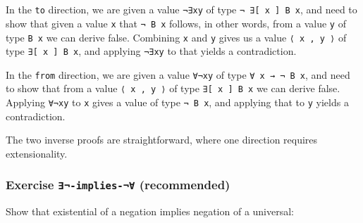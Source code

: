 \begin{fence}
\begin{code}
\AgdaSpace{}%
\AgdaSpace{}%
\AgdaSpace{}%
\AgdaOperator{\AgdaInductiveConstructor{,}}\AgdaSpace{}%
\AgdaSpace{}%
\AgdaSpace{}%
\AgdaSpace{}%
\AgdaSpace{}%
\AgdaSymbol{\}}\AgdaSpace{}%
\AgdaSymbol{\}}\<%
\\
%
\>[4]\AgdaSymbol{;}\AgdaSpace{}%
\AgdaSpace{}%
\AgdaSymbol{=}%
\>[17]\AgdaSpace{}%
\AgdaSpace{}%
\AgdaSpace{}%
\AgdaSpace{}%
\AgdaSymbol{\}}\<%
\\
%
\>[4]\AgdaSymbol{\}}\<%
\end{code}
\end{fence}

In the \texttt{to} direction, we are given a value \texttt{¬∃xy} of type
\texttt{¬\ ∃{[}\ x\ {]}\ B\ x}, and need to show that given a value
\texttt{x} that \texttt{¬\ B\ x} follows, in other words, from a value
\texttt{y} of type \texttt{B\ x} we can derive false. Combining
\texttt{x} and \texttt{y} gives us a value \texttt{⟨\ x\ ,\ y\ ⟩} of
type \texttt{∃{[}\ x\ {]}\ B\ x}, and applying \texttt{¬∃xy} to that
yields a contradiction.

In the \texttt{from} direction, we are given a value \texttt{∀¬xy} of
type \texttt{∀\ x\ →\ ¬\ B\ x}, and need to show that from a value
\texttt{⟨\ x\ ,\ y\ ⟩} of type \texttt{∃{[}\ x\ {]}\ B\ x} we can derive
false. Applying \texttt{∀¬xy} to \texttt{x} gives a value of type
\texttt{¬\ B\ x}, and applying that to \texttt{y} yields a
contradiction.

The two inverse proofs are straightforward, where one direction requires
extensionality.

\hypertarget{exercise--implies--recommended}{%
\subsubsection{\texorpdfstring{Exercise \texttt{∃¬-implies-¬∀}
(recommended)}{Exercise ∃¬-implies-¬∀ (recommended)}}\label{exercise--implies--recommended}}

Show that existential of a negation implies negation of a universal:

